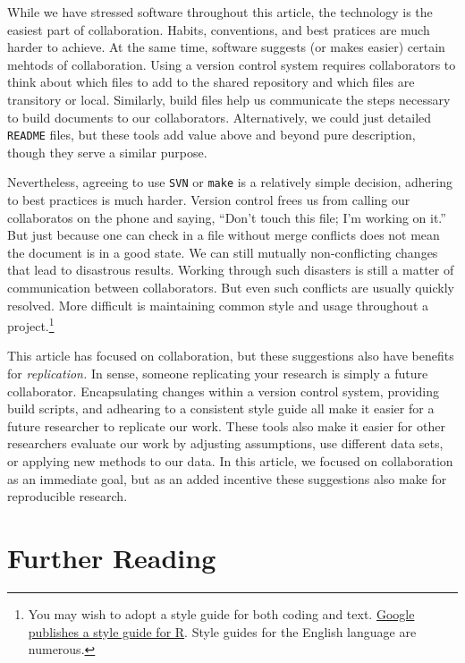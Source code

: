 \documentclass[]{article}
\begin{document}
While we have stressed software throughout this article, the technology is the
easiest part of collaboration. Habits, conventions, and best pratices are much
harder to achieve. At the same time, software suggests (or makes easier)
certain mehtods of collaboration. Using a version control system requires
collaborators to think about which files to add to the shared repository and
which files are transitory or local. Similarly, build files help us
communicate the steps necessary to build documents to our collaborators.
Alternatively, we could just detailed \texttt{README} files, but these tools
add value above and beyond pure description, though they serve a similar
purpose.

Nevertheless, agreeing to use \texttt{SVN} or \texttt{make} is a relatively
simple decision, adhering to best practices is much harder. Version control
frees us from calling our collaboratos on the phone and saying, ``Don't touch
this file; I'm working on it.'' But just because one can check in a file
without merge conflicts does not mean the document is in a good state. We can
still mutually non-conflicting changes that lead to disastrous results.
Working through such disasters is still a matter of communication between
collaborators. But even such conflicts are usually quickly resolved. More
difficult is maintaining common style and usage throughout a
project.\footnote{You may wish to adopt a style guide for both coding and
text.
\href{http://google-styleguide.googlecode.com/svn/trunk/google-r-style.html}{Google publishes a style guide for
R}.
Style guides for the English language are numerous.}

This article has focused on collaboration, but these suggestions also have
benefits for \emph{replication.} In sense, someone replicating your research
is simply a future collaborator. Encapsulating changes within a version
control system, providing build scripts, and adhearing to a consistent style
guide all make it easier for a future researcher to replicate our work. These
tools also make it easier for other researchers evaluate our work by adjusting assumptions, use
different data sets, or applying new methods to our data. In this article, we
focused on collaboration as an immediate goal, but as an added incentive these
suggestions also make for reproducible research. 


\section{Further Reading}

\end{document}

